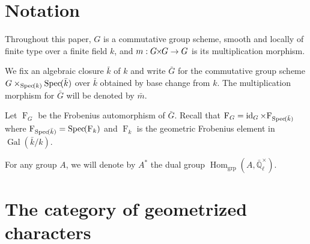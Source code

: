 \documentclass[11pt]{amsart}
\theoremstyle{plain}
\theoremstyle{definition}
\theoremstyle{remark}
\newcommand{\Spec}[1]{{\operatorname{Spec}\hskip-1pt( #1 )}}
\newcommand{\EE}{\mathbb{\bar Q}_\ell}
\newcommand{\bFq}{\bar{k}}
\newcommand{\Fq}{k}
\newcommand{\EEx}{\EE^\times}
\DeclareMathOperator{\Gal}{Gal}
\newcommand{\Frob}[1]{{\operatorname{F}_{#1}}}
\DeclareMathOperator{\Hom}{Hom}
\DeclareMathOperator{\id}{id}
\newcommand{\bm}{\bar{m}}
\newcommand{\bG}{\bar{G}}
\newcommand{\tight}[3]{\hspace{-#1pt}{#2}\hspace{-#3pt}}
\newcommand{\GxG}{\text{$G \tight{1}{\times}{1} G$}}
\begin{document}
\section{Notation}

Throughout this paper, $G$ is a commutative group scheme,
smooth and locally of finite type over a finite field $\Fq$, and $m : \GxG\to G$ is its multiplication morphism.

We fix an algebraic closure $\bFq$ of $\Fq$ and write $\bG$ for the
commutative group scheme $G \times_{\Spec{\Fq}} \Spec{\bFq}$ over $\bFq$ obtained by base change from $k$. The multiplication morphism for $\bG$ will be denoted by $\bm$. 

Let $\Frob{G}$ be the Frobenius automorphism of $\bG$.
Recall that $\Frob{G} = \id_{G}\times \Frob{\Spec{\bFq}}$ where
$\Frob{\Spec{\bFq}} = \Spec{\Frob{\Fq}}$ and $\Frob{\Fq}$  is the geometric Frobenius element in $\Gal(\bFq/\Fq)$.

For any group $A$, we will denote by $A^*$ the dual group $\Hom_\text{grp}(A, \EEx)$.

\section{The category of geometrized characters}\label{sec:category}
\end{document}

